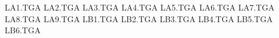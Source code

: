 LA1.TGA
LA2.TGA
LA3.TGA
LA4.TGA
LA5.TGA
LA6.TGA
LA7.TGA
LA8.TGA
LA9.TGA
LB1.TGA
LB2.TGA
LB3.TGA
LB4.TGA
LB5.TGA
LB6.TGA